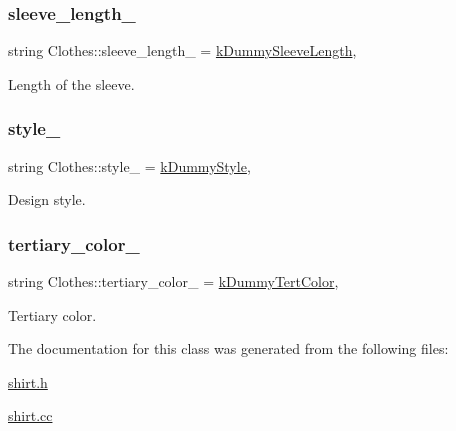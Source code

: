 \subsubsection{\texorpdfstring{sleeve\+\_\+length\+\_\+}{sleeve\_length\_}}
{\footnotesize\ttfamily string Clothes\+::sleeve\+\_\+length\+\_\+ = \mbox{\hyperlink{clothes_8h_a0f53dde6a2c4c344bb7da50655497350}{k\+Dummy\+Sleeve\+Length}}\hspace{0.3cm}{\ttfamily [protected]}, {\ttfamily [inherited]}}



Length of the sleeve. 

\mbox{\label{classClothes_aa85ed2b95110d8c477a1aca9cb403f98}} 
\subsubsection{\texorpdfstring{style\+\_\+}{style\_}}
{\footnotesize\ttfamily string Clothes\+::style\+\_\+ = \mbox{\hyperlink{clothes_8h_a9deec6ed1f40928bfa0040eeab95ed6b}{k\+Dummy\+Style}}\hspace{0.3cm}{\ttfamily [protected]}, {\ttfamily [inherited]}}



Design style. 

\mbox{\label{classClothes_a3c5f1e7ab531e3ba7a38b930da8078a0}} 
\subsubsection{\texorpdfstring{tertiary\+\_\+color\+\_\+}{tertiary\_color\_}}
{\footnotesize\ttfamily string Clothes\+::tertiary\+\_\+color\+\_\+ = \mbox{\hyperlink{clothes_8h_a094dde85547895fd70dafb3ab10c6783}{k\+Dummy\+Tert\+Color}}\hspace{0.3cm}{\ttfamily [protected]}, {\ttfamily [inherited]}}



Tertiary color. 



The documentation for this class was generated from the following files\+:\begin{DoxyCompactItemize}
\item 
\mbox{\hyperlink{shirt_8h}{shirt.\+h}}\item 
\mbox{\hyperlink{shirt_8cc}{shirt.\+cc}}\end{DoxyCompactItemize}

